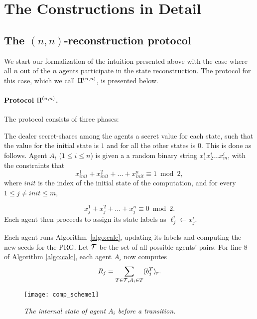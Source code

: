 \documentclass[letterpaper,11pt]{article}
\newcommand{\nnPi}{{\rm {\Pi}}^{(n,n)}}
\newcommand{\init}{\mathit{init}}
\begin{document}
 
\section{The Constructions in Detail}
\label{sec-from-all}

\subsection{The $(n,n)$-reconstruction protocol \label{sec-from-all-details}}
We start our formalization of the intuition presented above with the
case where all $n$ out of the $n$ agents participate in the state
reconstruction.  The protocol for this case, which we call $\nnPi$, is presented
below.

\vspace{-.1in}
\paragraph{Protocol $\nnPi$.} The protocol consists of three phases:

\vspace{.1in}

 The dealer secret-shares among the agents 
a secret value for each state, such that the value for the initial
state is $1$ and for all the other states is $0$. This is done as follows. 
Agent $A_i$ ($1\leq i\leq n$) is given a a random binary string
$x^i_1x^i_2...x^i_m$, with the constraints that 
$$x^1_{\init} + x^2_{\init} + ... + x^n_{\init}\equiv 1 \bmod 2,$$ 
where $\init$ is the index of the initial state of the
computation, and for every $1\leq j \neq init \leq m$, 

$$x^1_j + x^2_j + ... + x^n_j \equiv 0 \bmod 2.$$ 
Each agent then proceeds to assign its state labels as
$\ell_j^i \leftarrow x_j^i$.


\vspace{.1in}
  Each agent runs Algorithm~\ref{algo:calc},
updating its labels and computing the new seeds for the PRG.  
Let ${\cal T}$ be the set of all possible agents' pairs. For line 8
of Algorithm \ref{algo:calc}, each agent $A_i$ now computes
$$
R_j= \sum_{\substack{T\in {\cal T}, A_i\in T}} (b_j^T)_r.
$$


\begin{figure*} [ht]
\begin{center}
\texttt{[image: comp\_scheme1]}
\caption{\sl The internal state of agent $A_i$ before a transition.}
\end{center}
\label{fig:comp_scheme1}
\end{figure*}
\end{document}
